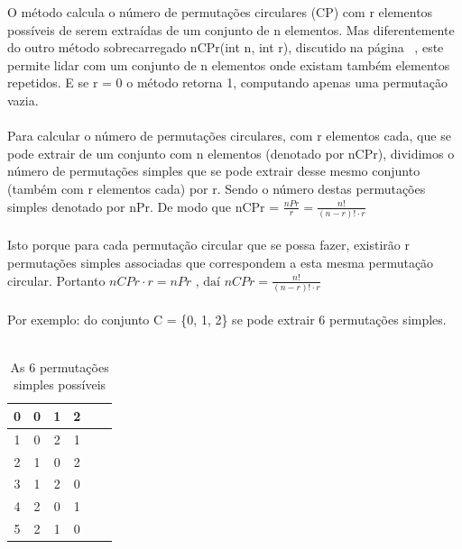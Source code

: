 \documentclass[a4paper,12pt,openany]{book}
\begin{document}
O método calcula o número de permutações circulares (CP) com r elementos possíveis de serem extraídas de um conjunto de n elementos. Mas diferentemente do outro método sobrecarregado nCPr(int n, int r), discutido na página ~\pageref{metodo:nCPr01}, este permite lidar com um conjunto de n elementos onde existam também elementos repetidos. E se r = 0 o método retorna 1, computando apenas uma permutação vazia. 
\\
\\
Para calcular o número de permutações circulares, com r elementos cada, que se pode extrair de um conjunto com n elementos (denotado por nCPr), dividimos o número de permutações simples que se pode extrair desse mesmo conjunto (também com r elementos cada) por r. Sendo o número destas permutações simples denotado por nPr. De modo que nCPr = $ \frac{nPr}{r} = \frac{n!}{(n-r)! \cdot r} $
\\
\\
Isto porque para cada permutação circular que se possa fazer, existirão r permutações simples associadas que correspondem a esta mesma permutação circular. Portanto 
$ nCPr \cdot r = nPr \text{ , daí }nCPr = \frac{n!}{(n-r)! \cdot r} $
\\
\\
Por exemplo: do conjunto C = \{0, 1, 2\} se pode extrair 6 permutações simples.
\\
\\
\begin{table}[h]
	\begin{center}
		\begin{tabular}{|c||c|c|c|c|c|}
			\hline
			0 & 0 & 1 & 2\\
			\hline
	    	1 & 0 & 2 & 1\\
			\hline
			2 & 1 & 0 & 2\\
			\hline
			3 & 1 & 2 & 0\\
			\hline
			4 & 2 & 0 & 1\\
			\hline
			5 & 2 & 1 & 0\\
			\hline
		\end{tabular}
	\end{center}
	\caption{As 6 permutações simples possíveis}
\end{table}
\end{document}
